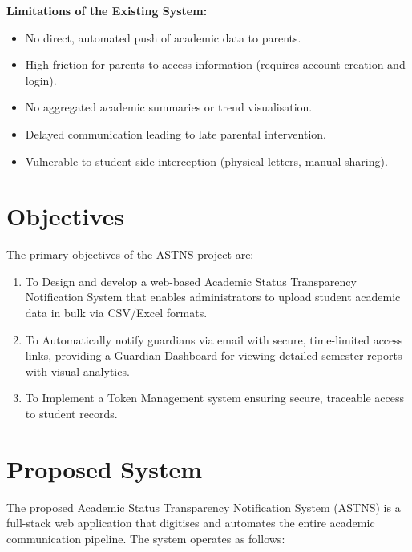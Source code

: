 \documentclass[12pt,a4paper]{report}
\begin{document}
\textbf{Limitations of the Existing System:}
\begin{itemize}
  \item No direct, automated push of academic data to parents.
  \item High friction for parents to access information (requires account creation and login).
  \item No aggregated academic summaries or trend visualisation.
  \item Delayed communication leading to late parental intervention.
  \item Vulnerable to student-side interception (physical letters, manual sharing).
\end{itemize}

\section{Objectives}
The primary objectives of the ASTNS project are:

\begin{enumerate}
  \item To Design and develop a web-based Academic Status Transparency Notification System that enables administrators to upload student academic data in bulk via CSV/Excel formats.
  \item To Automatically notify guardians via email with secure, time-limited access links, providing a Guardian Dashboard for viewing detailed semester reports with visual analytics.
  \item To Implement a Token Management system ensuring secure, traceable access to student records.
\end{enumerate}

\section{Proposed System}
The proposed Academic Status Transparency Notification System (ASTNS) is a full-stack web application that digitises and automates the entire academic communication pipeline. The system operates as follows:
\end{document}
